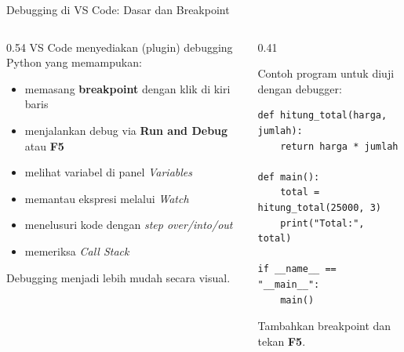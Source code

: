 \documentclass[aspectratio=169, table]{beamer}
\begin{document}
\begin{frame}[fragile]{Debugging di VS Code: Dasar dan Breakpoint}
\vspace{10pt}

\begin{columns}[T]

\begin{column}{0.54\linewidth}
VS Code menyediakan (plugin) debugging Python yang memampukan:

\begin{itemize}
    \item memasang \textbf{breakpoint} dengan klik di kiri baris
    \item menjalankan debug via \textbf{Run and Debug} atau \textbf{F5}
    \item melihat variabel di panel \textit{Variables}
    \item memantau ekspresi melalui \textit{Watch}
    \item menelusuri kode dengan \textit{step over/into/out}
    \item memeriksa \textit{Call Stack}
\end{itemize}

Debugging menjadi lebih mudah secara visual.
\end{column}

\begin{column}{0.41\linewidth}

Contoh program untuk diuji dengan debugger:

\begin{lstlisting}[style=PythonStyle, basicstyle=\ttfamily\scriptsize]
def hitung_total(harga, jumlah):
    return harga * jumlah

def main():
    total = hitung_total(25000, 3)
    print("Total:", total)

if __name__ == "__main__":
    main()
\end{lstlisting}

Tambahkan breakpoint dan tekan \textbf{F5}.
\end{column}

\end{columns}

\end{frame}
\end{document}
